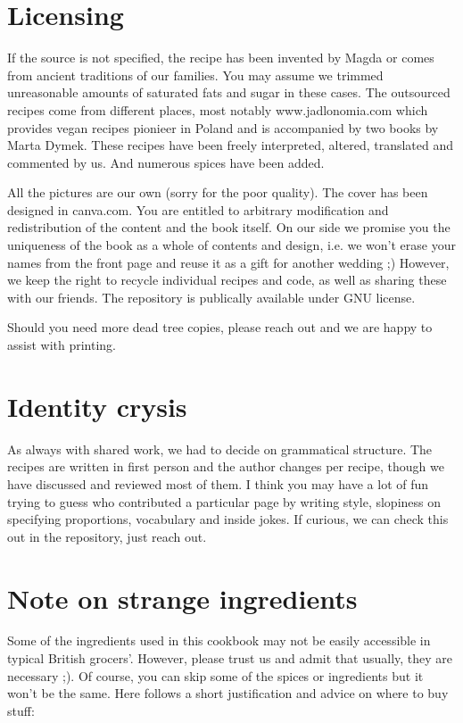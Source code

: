 \section*{Licensing}
If the source is not specified, the recipe has been invented by Magda or comes from
ancient traditions of our families.
You may assume we trimmed unreasonable amounts of saturated fats and sugar in these cases.
The outsourced recipes come from different places, most notably www.jadlonomia.com which
provides vegan recipes pionieer in Poland and is accompanied by two books by Marta Dymek.
These recipes have been freely interpreted, altered, translated and commented by us. And numerous spices have been added.

All the pictures are our own (sorry for the poor quality).
The cover has been designed in canva.com.
You are entitled to arbitrary modification and redistribution of the content and the book itself.
On our side we promise you the uniqueness of the book as a whole of contents and design,
i.e. we won't erase your names from the front page and reuse it as a gift for another wedding ;)
However, we keep the right to recycle individual recipes and code,
as well as sharing these with our friends. The repository is publically available under GNU license.

Should you need more dead tree copies, please reach out and we are happy to assist with printing.

\section*{Identity crysis}
As always with shared work, we had to decide on grammatical structure.
The recipes are written in first person and the author changes per recipe,
though we have discussed and reviewed most of them.
I think you may have a lot of fun trying to guess who contributed a particular page
by writing style, slopiness on specifying proportions, vocabulary and inside jokes.
If curious, we can check this out in the repository, just reach out.

\section*{Note on strange ingredients}

Some of the ingredients used in this cookbook may not be easily accessible in typical British grocers'.
However, please trust us and admit that usually, they are necessary ;). Of course, you can skip some of the spices or ingredients but it won't be the same. Here follows a short justification and advice on where to buy stuff: 

